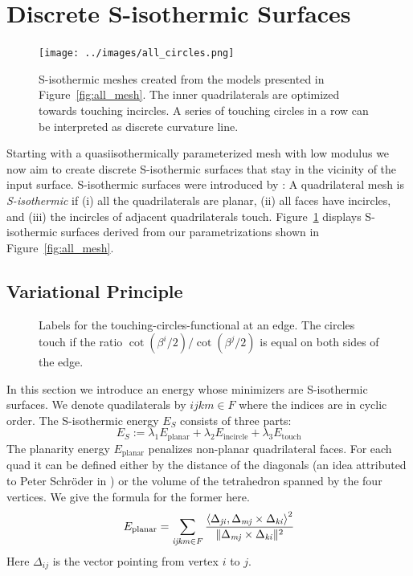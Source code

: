 \documentclass[twoside]{article}
\begin{document}
\section{Discrete S-isothermic Surfaces}
\label{sec:s-isothermic}

\begin{figure}[t]
\centering
\texttt{[image: ../images/all\_circles.png]}
\caption{S-isothermic meshes created from the models presented in
Figure~\ref{fig:all_mesh}.
The inner quadrilaterals are optimized towards touching incircles. A series of
touching circles in a row can be interpreted as discrete curvature line.}
\label{fig:s_isothermic}
\end{figure}

Starting with a quasiisothermically parameterized mesh with low modulus 
we now aim to create discrete S-isothermic surfaces that
stay in the vicinity of the input surface. S-isothermic surfaces were
introduced by \cite{BobPin:DiscSurfIntSys:1996}: A quadrilateral mesh
is \mbox{\emph{S-isothermic}} if (i) all the quadrilaterals are planar, (ii)
all faces have incircles, and (iii) the incircles of adjacent quadrilaterals
touch.
Figure~\ref{fig:s_isothermic} displays S-isothermic surfaces derived from our
parametrizations shown in Figure~\ref{fig:all_mesh}.

\subsection{Variational Principle}

\begin{figure}[t]

\centering
\caption{Labels for the touching-circles-functional at an edge. The circles touch 
if the ratio $\cot\left(\beta^i/2\right)/\cot\left(\beta^j/2\right)$ is equal on both sides of the edge.}
\label{fig:functional}
\end{figure}

In this section we introduce an energy whose minimizers are S-isothermic
surfaces. We denote quadilaterals by $ijkm\in F$ where the indices are in 
cyclic order.
The S-isothermic energy $E_S$ consists of three parts:
\begin{equation}
  E_S := 
  \lambda_1 E_{\mathrm{planar}} + 
  \lambda_2 E_{\mathrm{incircle}} + 
  \lambda_3 E_{\mathrm{touch}}
\end{equation}
The planarity energy $E_{\mathrm{planar}}$ penalizes non-planar quadrilateral
faces. For each quad it can be defined either by the distance of the diagonals
(an idea attributed to Peter Schr\"oder in \cite{PottmannSBSWBW08}) or the
volume of the tetrahedron spanned by the
four vertices. We give the formula for the former here. 
\begin{equation}
E_{\mathrm{planar}} = \sum_{\mathrm{\it{ijkm}} \in F} \frac{\left<\Delta_{\mathrm{\it{ji}}},\Delta_{\mathrm{\it{mj}}} \times \Delta_{\mathrm{\it{ki}}}\right>^2}
{\Vert\Delta_{\mathrm{\it{mj}}} \times \Delta_{\mathrm{\it{ki}}}\Vert^2}
\end{equation}
Here $\Delta_{ij}$ is the vector pointing from vertex $i$ to $j$.
\end{document}
